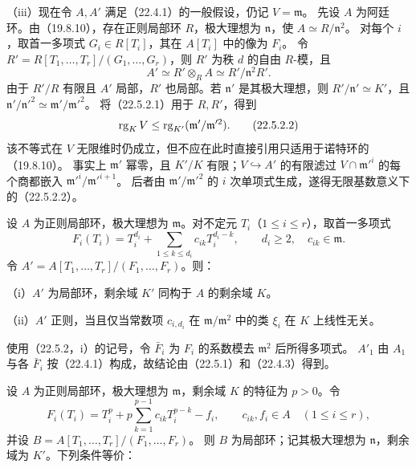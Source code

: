 （iii）现在令 $A,A'$ 满足（22.4.1）的一般假设，仍记 $V=\mathfrak m$。
先设 $A$ 为阿廷环。由（19.8.10），存在正则局部环 $R$，极大理想为 $\mathfrak n$，使 $A\simeq R/\mathfrak n^2$。
对每个 $i$，取首一多项式 $G_i\in R[T_i]$，其在 $A[T_i]$ 中的像为 $F_i$。
令 $R'=R[T_1,\ldots,T_r]/(G_1,\ldots,G_r)$，则 $R'$ 为秩 $d$ 的自由 $R$-模，且
\[
 A'\simeq R'\otimes_RA\simeq R'/\mathfrak n^2R'.
\]
由于 $R'/R$ 有限且 $A'$ 局部，$R'$ 也局部。若 $\mathfrak n'$ 是其极大理想，则
$R'/\mathfrak n'\simeq K'$，且 $\mathfrak n'/\mathfrak n'^2\simeq\mathfrak m'/\mathfrak m'^2$。
将（22.5.2.1）用于 $R,R'$，得到
\begin{equation}
 \operatorname{rg}_KV\le\operatorname{rg}_{K'}(\mathfrak m'/\mathfrak m'^2).
 \tag{22.5.2.2}
\end{equation}
该不等式在 $V$ 无限维时仍成立，但不应在此时直接引用只适用于诺特环的（19.8.10）。
事实上 $\mathfrak m'$ 幂零，且 $K'/K$ 有限；$V\hookrightarrow A'$ 的有限滤过
$V\cap\mathfrak m'^i$ 的每个商都嵌入 $\mathfrak m'^i/\mathfrak m'^{i+1}$。
后者由 $\mathfrak m'/\mathfrak m'^2$ 的 $i$ 次单项式生成，遂得无限基数意义下的（22.5.2.2）。

设 $A$ 为正则局部环，极大理想为 $\mathfrak m$。对不定元 $T_i$（$1\le i\le r$），取首一多项式
\begin{equation}
 F_i(T_i)=T_i^{d_i}+\sum_{1\le k\le d_i}c_{ik}T_i^{d_i-k},
 \qquad d_i\ge2,\quad c_{ik}\in\mathfrak m.
 \tag{22.5.3.1}
\end{equation}
令 $A'=A[T_1,\ldots,T_r]/(F_1,\ldots,F_r)$。则：

\noindent（i）$A'$ 为局部环，剩余域 $K'$ 同构于 $A$ 的剩余域 $K$。

\noindent（ii）$A'$ 正则，当且仅当常数项 $c_{i,d_i}$ 在 $\mathfrak m/\mathfrak m^2$ 中的类 $\xi_i$ 在 $K$ 上线性无关。

\eproof
使用（22.5.2，i）的记号，令 $\bar F_i$ 为 $F_i$ 的系数模去 $\mathfrak m^2$ 后所得多项式。
$A'_1$ 由 $A_1$ 与各 $\bar F_i$ 按（22.4.1）构成，故结论由（22.5.1）和（22.4.3）得到。
\finishproof

设 $A$ 为正则局部环，极大理想为 $\mathfrak m$，剩余域 $K$ 的特征为 $p>0$。令
\begin{equation}
 F_i(T_i)=T_i^p+p\sum_{k=1}^{p-1}c_{ik}T_i^{p-k}-f_i,
 \qquad c_{ik},f_i\in A\quad(1\le i\le r),
 \tag{22.5.4.1}
\end{equation}
并设 $B=A[T_1,\ldots,T_r]/(F_1,\ldots,F_r)$。
则 $B$ 为局部环；记其极大理想为 $\mathfrak n$，剩余域为 $K'$。下列条件等价：


